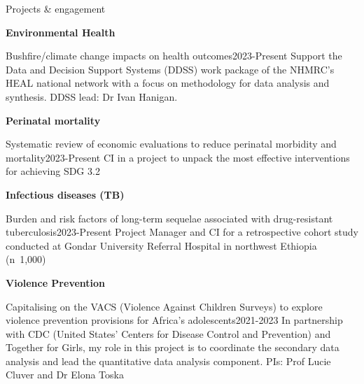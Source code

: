 \begin{rSection}{Projects \& engagement}

\begin{etaremune}

\vspace{1em}
\item \textbf{Environmental Health}\par

\begin{rSubsection}
{Bushfire/climate change impacts on health outcomes}{2023-Present}
{Support the Data and Decision Support Systems (DDSS) work package of the NHMRC’s HEAL national network with a focus on methodology for data analysis and synthesis. DDSS lead: Dr Ivan Hanigan.} \par
\end{rSubsection}

\vspace{1em}
\item \textbf{Perinatal mortality}\par

\begin{rSubsection}
{Systematic review of economic evaluations to reduce perinatal morbidity and mortality}{2023-Present}
{CI in a project to unpack the most effective interventions for achieving SDG 3.2} \par
\end{rSubsection}

\vspace{1em}
\item \textbf{Infectious diseases (TB)}\par

\begin{rSubsection}
{Burden and risk factors of long-term sequelae associated with drug-resistant tuberculosis}{2023-Present}
{Project Manager and CI for a retrospective cohort study conducted at Gondar University Referral Hospital in northwest Ethiopia (n~1,000)} \par
\end{rSubsection}

\vspace{1em}
\item \textbf{Violence Prevention}\par

\begin{rSubsection}
{Capitalising on the VACS (Violence Against Children Surveys) to explore violence prevention provisions for Africa’s adolescents}{2021-2023}
{In partnership with CDC (United States' Centers for Disease Control and Prevention) and Together for Girls, my role in this project is to coordinate the secondary data analysis and lead the quantitative data analysis component. PIs: Prof Lucie Cluver and Dr Elona Toska} \par
\end{rSubsection}


\end{etaremune}
\end{rSection}
